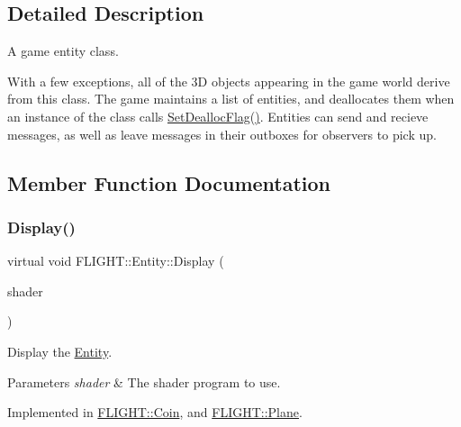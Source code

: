 \subsection{Detailed Description}
A game entity class. 

With a few exceptions, all of the 3D objects appearing in the game world derive from this class. The game maintains a list of entities, and deallocates them when an instance of the class calls \hyperlink{class_f_l_i_g_h_t_1_1_entity_a6f6d61a5135159ae276e3d6c45b237dc}{Set\+Dealloc\+Flag()}. Entities can send and recieve messages, as well as leave messages in their outboxes for observers to pick up. 

\subsection{Member Function Documentation}
\mbox{\label{class_f_l_i_g_h_t_1_1_entity_aa7416cd150913194b32255a46c2848ba}} 
\subsubsection{\texorpdfstring{Display()}{Display()}}
{\footnotesize\ttfamily virtual void F\+L\+I\+G\+H\+T\+::\+Entity\+::\+Display (\begin{DoxyParamCaption}\item[{\hyperlink{class_f_l_i_g_h_t_1_1_shader_program}{Shader\+Program} \&}]{shader }\end{DoxyParamCaption})\hspace{0.3cm}{\ttfamily [pure virtual]}}



Display the \hyperlink{class_f_l_i_g_h_t_1_1_entity}{Entity}. 


\begin{DoxyParams}{Parameters}
{\em shader} & The shader program to use. \\
\hline
\end{DoxyParams}


Implemented in \hyperlink{class_f_l_i_g_h_t_1_1_coin_a58efad82df5912b37de5084b9575c59d}{F\+L\+I\+G\+H\+T\+::\+Coin}, and \hyperlink{class_f_l_i_g_h_t_1_1_plane_a9332671f6542f3c401c19a1ec9eb86d7}{F\+L\+I\+G\+H\+T\+::\+Plane}.

\mbox{\label{class_f_l_i_g_h_t_1_1_entity_a00a100b26af24e3929fa898208606557}} 
